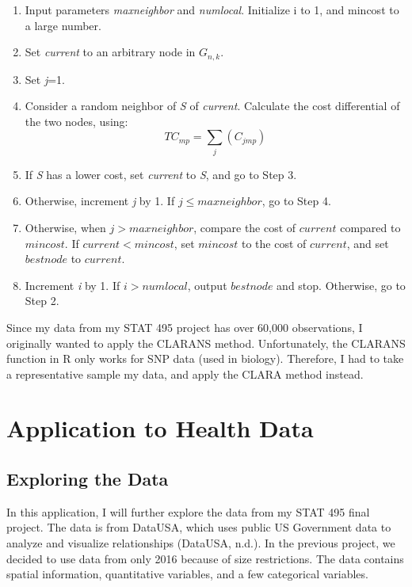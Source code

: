 \documentclass[12pt,twoside]{amherstthesis}
\providecommand{\tightlist}{%
  \setlength{\itemsep}{0pt}\setlength{\parskip}{0pt}}
\begin{document}
  \begin{enumerate}
  \def\labelenumi{\arabic{enumi}.}
  \tightlist
  \item
    Input parameters \emph{maxneighbor} and \emph{numlocal}. Initialize i
    to 1, and mincost to a large number.
  \item
    Set \emph{current} to an arbitrary node in \(G_{n,k}\).
  \item
    Set \emph{j}=1.
  \item
    Consider a random neighbor of \emph{S} of \emph{current}. Calculate
    the cost differential of the two nodes, using:
    \[ TC_{mp} = \sum_j(C_{jmp}) \]
  \item
    If \emph{S} has a lower cost, set \emph{current} to \emph{S}, and go
    to Step 3.
  \item
    Otherwise, increment \emph{j} by 1. If \(j \leq maxneighbor\), go to
    Step 4.
  \item
    Otherwise, when \(j > maxneighbor\), compare the cost of \(current\)
    compared to \(mincost\). If \(current < mincost\), set \(mincost\) to
    the cost of \(current\), and set \(bestnode\) to \(current\).
  \item
    Increment \emph{i} by 1. If \(i > numlocal\), output \(bestnode\) and
    stop. Otherwise, go to Step 2.
  \end{enumerate}
  
  Since my data from my STAT 495 project has over 60,000 observations, I
  originally wanted to apply the CLARANS method. Unfortunately, the
  CLARANS function in R only works for SNP data (used in biology).
  Therefore, I had to take a representative sample my data, and apply the
  CLARA method instead.
  
  \chapter{Application to Health Data}\label{typeset-equ}
  
  \section{Exploring the Data}\label{exploring-the-data}
  
  In this application, I will further explore the data from my STAT 495
  final project. The data is from DataUSA, which uses public US Government
  data to analyze and visualize relationships (DataUSA, n.d.). In the
  previous project, we decided to use data from only 2016 because of size
  restrictions. The data contains spatial information, quantitative
  variables, and a few categorical variables.
  
\end{document}
